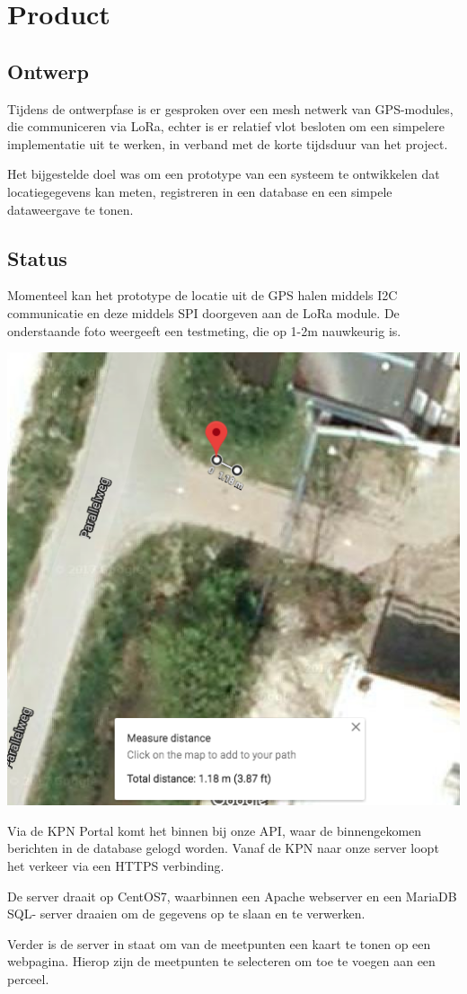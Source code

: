 \section{Product}
\subsection{Ontwerp}
Tijdens de ontwerpfase is er gesproken over een mesh netwerk van GPS-modules, die
communiceren via LoRa, echter is er relatief vlot besloten om een simpelere
implementatie uit te werken, in verband met de korte tijdsduur van het project.

Het bijgestelde doel was om een prototype van een systeem te ontwikkelen dat
locatiegegevens kan meten, registreren in een database en een simpele dataweergave
te tonen.

\subsection{Status}
Momenteel kan het prototype de locatie uit de GPS halen middels I2C communicatie
en deze middels SPI doorgeven aan de LoRa module. De onderstaande foto weergeeft
een testmeting, die op 1-2m nauwkeurig is.

\begin{center}
\includegraphics[width=0.5\linewidth]{final_report/measurement0.png}
\end{center}

Via de KPN Portal komt het binnen bij onze API, waar de binnengekomen berichten
in de database gelogd worden. Vanaf de KPN naar onze server loopt het verkeer via
een HTTPS verbinding.

De server draait op CentOS7, waarbinnen een Apache webserver en een MariaDB SQL-
server draaien om de gegevens op te slaan en te verwerken.

\newpage
Verder is de server in staat om van de meetpunten een kaart te tonen op een
webpagina. Hierop zijn de meetpunten te selecteren om toe te voegen aan een perceel.

